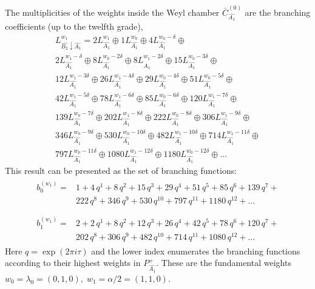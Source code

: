 \documentclass[12pt]{iopart}
\theoremstyle{definition}
\theoremstyle{definition}
\theoremstyle{definition}
\begin{document}
The multiplicities of the weights inside the  Weyl chamber
$\bar{C}^{\left( 0 \right)}_{\hat{A_1}}$
are the branching coefficients (up to the twelfth grade),
\begin{eqnarray*}
  \label{eq:28}
  L^{w_1}_{\hat{B_2}\downarrow \hat{A_1}}=2 L_{\hat{A_1}}^{w_1}\oplus 1 L_{\hat{A_1}}^{w_0}\oplus 4 L_{\hat{A_1}}^{w_0-\delta}\oplus\\
    2 L_{\hat{A_1}}^{w_1-\delta}\oplus 8 L_{\hat{A_1}}^{w_0-2\delta}\oplus
    8 L_{\hat{A_1}}^{w_1-2\delta}\oplus 15 L_{\hat{A_1}}^{w_0-3\delta}\oplus\\
    12 L_{\hat{A_1}}^{w_1-3\delta}\oplus 26 L_{\hat{A_1}}^{w_1-4\delta}\oplus
    29 L_{\hat{A_1}}^{w_0-4\delta}\oplus 51 L_{\hat{A_1}}^{w_0-5\delta}\oplus\\
    42 L_{\hat{A_1}}^{w_1-5\delta}\oplus 78 L_{\hat{A_1}}^{w_1-6\delta}\oplus
    85 L_{\hat{A_1}}^{w_0-6\delta}\oplus 120 L_{\hat{A_1}}^{w_1-7\delta}\oplus\\
    139 L_{\hat{A_1}}^{w_0-7\delta}\oplus 202 L_{\hat{A_1}}^{w_1-8\delta}\oplus
    222 L_{\hat{A_1}}^{w_0-8\delta}\oplus 306 L_{\hat{A_1}}^{w_1-9\delta}\oplus\\
    346 L_{\hat{A_1}}^{w_0-9\delta}\oplus 530 L_{\hat{A_1}}^{w_0-10\delta}\oplus
    482 L_{\hat{A_1}}^{w_1-10\delta}\oplus 714 L_{\hat{A_1}}^{w_1-11\delta}\oplus\\
    797 L_{\hat{A_1}}^{w_0-11\delta}\oplus 1080 L_{\hat{A_1}}^{w_1-12\delta}\oplus
    1180 L_{\hat{A_1}}^{w_0-12\delta}\oplus \dots
\end{eqnarray*}
This result can be presented as the set of branching functions:
\begin{eqnarray*}
  \label{eq:29}
  \begin{array}{cc}
    b^{(w_1)}_{0}= & 1 + 4\,q^{1}+ 8\,q^{2}+ 15\,q^{3}+ 29\,q^{4}+ 51\,q^{5}+ 85\,q^{6}+ 139\,q^{7}+\\
     &222\,q^{8}+ 346\,q^{9}+ 530\,q^{10}+ 797\,q^{11}+ 1180\,q^{12}+\dots\\
  \end{array}\\
  \begin{array}{cc}
    b^{(w_1)}_{1}= &2+2\,q^{1}+8\,q^{2}+12\,q^{3}+26\,q^{4}+42\,q^{5}+78\,q^{6}+120\,q^{7}+\\
    & 202\,q^{8}+306\,q^{9}+482\,q^{10}+714\,q^{11}+1080\,q^{12}+\dots
  \end{array}
\end{eqnarray*}
Here $q=\exp (2\pi i \tau)$ and the lower index enumerates the branching functions according
to their highest weights in $P^+_{\hat{A_1}}$.
These are the fundamental weights $w_0=\lambda_0=(0,1,0),\; w_1=\alpha/2=(1,1,0)$.
\end{document}
